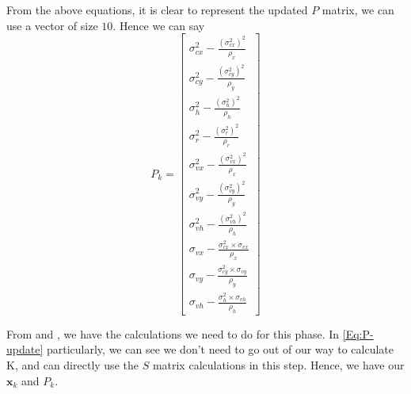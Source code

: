 \documentclass[10pt]{article}
\begin{document}
    \noindent From the above equations, it is clear to represent the updated \(P\) matrix, we can use a vector of size \(10\). Hence we can say
    \begin{equation}
        P_k = \begin{bmatrix}
            \sigma^2_{cx} - \frac{(\sigma^2_{cx})^2}{\rho_x} \\[5pt]
                \sigma^2_{cy} - \frac{(\sigma^2_{cy})^2}{\rho_y} \\[5pt]
                \sigma^2_h - \frac{(\sigma^2_h)^2}{\rho_h} \\[5pt]
                \sigma^2_r - \frac{(\sigma^2_r)^2}{\rho_r} \\[5pt]
                \sigma^2_{vx} - \frac{(\sigma^2_{vx})^2}{\rho_{x}} \\[5pt]
                \sigma^2_{vy} - \frac{(\sigma^2_{vy})^2}{\rho_{y}} \\[5pt]
                \sigma^2_{vh} - \frac{(\sigma^2_{vh})^2}{\rho_{h}} \\[5pt]
                \sigma_{vx} - \frac{\sigma^2_{cx} \times \sigma_{vx}}{\rho_x} \\[5pt]
                \sigma_{vy} - \frac{\sigma^2_{cy} \times \sigma_{vy}}{\rho_y} \\[5pt]
                \sigma_{vh} - \frac{\sigma^2_h \times \sigma_{vh}}{\rho_h}
            \end{bmatrix}
            \label{Eq:P-update}
    \end{equation}

    \noindent From  and , we have the calculations we need to do for this phase. In \eqref{Eq:P-update} particularly, we can see we don't need to go 
    out of our way to calculate K, and can directly use the \(S\) matrix calculations in this step. Hence, we have our \(\mathbf{x}_k\) and \(P_k\). 
\end{document}
